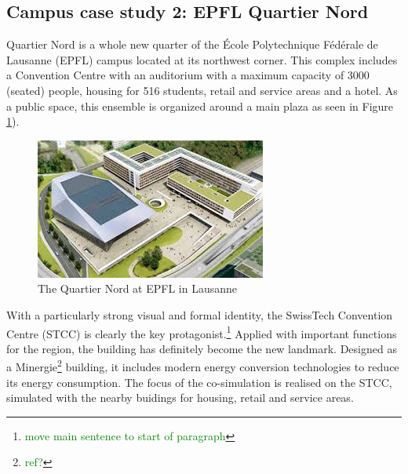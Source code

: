 \documentclass{tBPS2e}
\theoremstyle{plain}
\theoremstyle{definition}
\theoremstyle{remark}
\newcommand{\noteDT}[1]{\footnote{\textcolor{green}{#1}}}
\begin{document}





\subsection{Campus case study 2: EPFL Quartier Nord}
Quartier Nord is a whole new quarter of the École Polytechnique Fédérale de Lausanne (EPFL) campus located at its northwest corner. This complex includes a Convention Centre with an auditorium with a maximum capacity of 3000 (seated) people, housing for 516 students, retail and service areas and a hotel. As a public space, this ensemble is organized around a main plaza as seen in  Figure \ref{fig:quartier_nord_1}).

\begin{figure}[H]
\centering
\includegraphics[]{figures/quartier_nord_1}
\caption{The Quartier Nord at EPFL in Lausanne}
\label{fig:quartier_nord_1}
\end{figure}

With a particularly strong visual and formal identity, the SwissTech Convention Centre (STCC) is clearly the key protagonist.\noteDT{move main sentence to start of paragraph} Applied with important functions for the region, the building has definitely become the new landmark. Designed as a Minergie\noteDT{ref?} building, it includes modern energy conversion technologies to reduce its energy consumption. The focus of the co-simulation is realised on the STCC, simulated with the nearby buidings for housing, retail and service areas.
\end{document}
